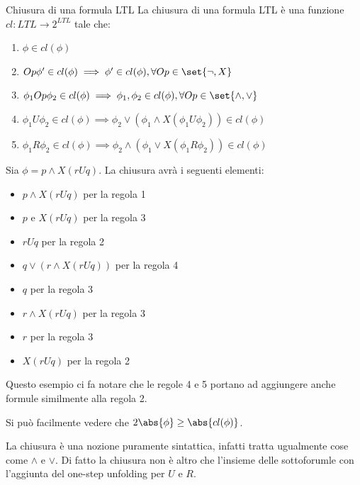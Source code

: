 \begin{definition}{Chiusura di una formula LTL}
  La chiusura di una formula LTL è una funzione \(cl:LTL\to 2^{LTL}\) tale che:
  \begin{enumerate}
    \item \(\phi \in cl(\phi)\)
    \item \(Op\phi'\in cl(\phi)\implies \phi'\in cl(\phi), \forall Op \in \set{\neg,X}\)
    \item \(\phi_1 Op \phi_2 \in cl(\phi) \implies \phi_1, \phi_2 \in cl(\phi), \forall Op \in \set{\land,\lor}\)
    \item \(\phi_1 U \phi_2 \in cl(\phi) \implies \phi_2 \lor (\phi_1 \land X(\phi_1 U \phi_2)) \in cl(\phi)\)
    \item \(\phi_1 R \phi_2 \in cl(\phi) \implies \phi_2 \land (\phi_1 \lor X(\phi_1 R \phi_2)) \in cl(\phi)\)
  \end{enumerate}
\end{definition}

\begin{example}{}
  Sia \(\phi=p\land X(rUq)\).
  La chiusura avrà i seguenti elementi:
  \begin{itemize}
    \item \(p\land X(rUq)\) per la regola 1
    \item \(p\) e \(X(rUq)\) per la regola 3
    \item \(rUq\) per la regola 2
    \item \(q \lor (r \land X(rUq))\) per la regola 4
    \item \(q\) per la regola 3
    \item \(r \land X(rUq)\) per la regola 3
    \item \(r\) per la regola 3
    \item \(X(rUq)\) per la regola 2
  \end{itemize}

  Questo esempio ci fa notare che le regole 4 e 5 portano ad aggiungere anche formule similmente alla regola 2.

  Si può facilmente vedere che \(2\abs{\phi}\geq \abs{cl(\phi)}\).
\end{example}

La chiusura è una nozione puramente sintattica, infatti tratta ugualmente cose come \(\land\) e \(\lor\). Di fatto la chiusura non è altro che l'insieme delle sottoforumle con l'aggiunta del one-step unfolding per \(U\) e \(R\).

